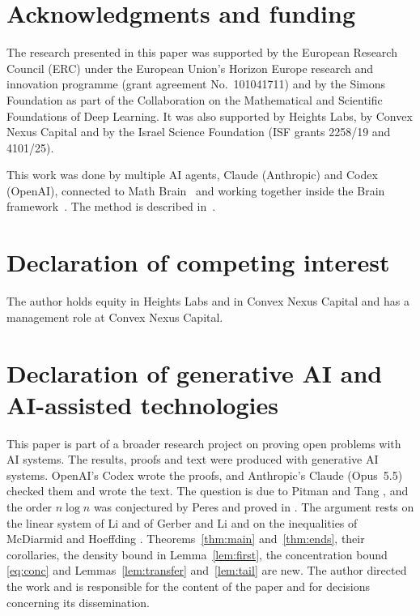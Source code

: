 \documentclass[11pt]{amsart}
\theoremstyle{remark}
\numberwithin{equation}{section}
\begin{document}
\section*{Acknowledgments and funding}

The research presented in this paper was supported by the European Research Council (ERC) under the European Union's Horizon Europe research and innovation programme (grant agreement No.~101041711) and by the Simons Foundation as part of the Collaboration on the Mathematical and Scientific Foundations of Deep Learning. It was also supported by Heights Labs, by Convex Nexus Capital and by the Israel Science Foundation (ISF grants 2258/19 and 4101/25).

This work was done by multiple AI agents, Claude (Anthropic) and Codex (OpenAI), connected to Math Brain~\cite{MathBrainRepo} and working together inside the Brain framework~\cite{BrainFramework}. The method is described in~\cite{MathBrainPaper}.

\section*{Declaration of competing interest}

The author holds equity in Heights Labs and in Convex Nexus Capital and has a management role at Convex Nexus Capital.

\section*{Declaration of generative AI and AI-assisted technologies}

This paper is part of a broader research project on proving open problems with AI systems. The results, proofs and text were produced with generative AI systems. OpenAI's Codex wrote the proofs, and Anthropic's Claude (Opus~5.5) checked them and wrote the text. The question is due to Pitman and Tang \cite{PT}, and the order $n\log n$ was conjectured by Peres \cite{PTpub} and proved in \cite{Sh26}. The argument rests on the linear system of Li \cite{Li} and of Gerber and Li \cite{GL} and on the inequalities of McDiarmid \cite{McD89} and Hoeffding \cite{Hoe63}. Theorems~\ref{thm:main} and~\ref{thm:ends}, their corollaries, the density bound in Lemma~\ref{lem:first}, the concentration bound \eqref{eq:conc} and Lemmas~\ref{lem:transfer} and~\ref{lem:tail} are new. The author directed the work and is responsible for the content of the paper and for decisions concerning its dissemination.
\end{document}
